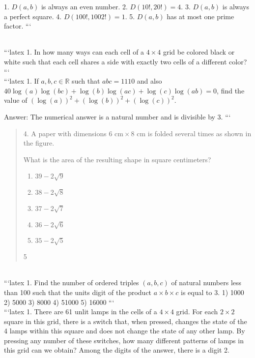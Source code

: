 1. $D(a, b)$ is always an even number.
2. $D(10!, 20!) = 4$.
3. $D(a, b)$ is always a perfect square.
4. $D(100!, 1002!) = 1$.
5. $D(a, b)$ has at most one prime factor.
```

\\
```latex
1. In how many ways can each cell of a $4 \times 4$ grid be colored black or white such that each cell shares a side with exactly two cells of a different color?
```
\\
```latex
1. If $a, b, c \in \mathbb{R}$ such that $abc = 1110$ and also 
$40 \log(a) \log(bc) + \log(b) \log(ac) + \log(c) \log(ab) = 0$, 
find the value of $(\log(a))^2 + (\log(b))^2 + (\log(c))^2$.

Answer: The numerical answer is a natural number and is divisible by 3.
```
\\
\begin{quote}
4. A paper with dimensions $6 \text{ cm} \times 8 \text{ cm}$ is folded several times as shown in the figure. 

What is the area of the resulting shape in square centimeters? 
\begin{enumerate}
    \item $39 - 2\sqrt{9}$
    \item $38 - 2\sqrt{8}$
    \item $37 - 2\sqrt{7}$
    \item $36 - 2\sqrt{6}$
    \item $35 - 2\sqrt{5}$
\end{enumerate}

5
\end{quote}
\\
```latex
1. Find the number of ordered triples $(a, b, c)$ of natural numbers less than 100 such that the units digit of the product $a \times b \times c$ is equal to 3.
1) 1000  2) 5000  3) 8000  4) 51000  5) 16000
```
\\
```latex
1. There are 61 unlit lamps in the cells of a $4 \times 4$ grid. For each $2 \times 2$ square in this grid, there is a switch that, when pressed, changes the state of the 4 lamps within this square and does not change the state of any other lamp. By pressing any number of these switches, how many different patterns of lamps in this grid can we obtain? Among the digits of the answer, there is a digit 2.

